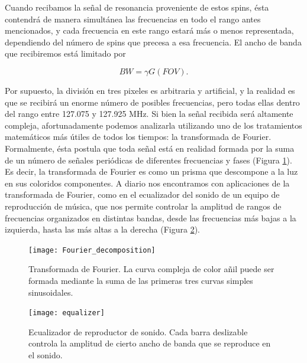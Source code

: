 Cuando recibamos la señal de resonancia proveniente de estos spins, ésta contendrá de manera simultánea las frecuencias en todo el rango antes mencionados, y cada frecuencia en este rango estará más o menos representada, dependiendo del número de spins que precesa a esa frecuencia. El ancho de banda que recibiremos está limitado por

\begin{equation}
 BW = \gamma G (FOV).
 \label{eq_bw_read}
\end{equation}


Por supuesto, la división en tres pixeles es arbitraria y artificial, y la realidad es que se recibirá un enorme número de posibles frecuencias, pero todas ellas dentro del rango entre 127.075 y 127.925 MHz.  Si bien la señal recibida será altamente compleja, afortunadamente podemos analizarla utilizando uno de los tratamientos matemáticos más útiles de todos los tiempos: la transformada de Fourier. Formalmente, ésta postula que toda señal está en realidad formada por la suma de un número de señales periódicas de diferentes frecuencias y fases (Figura \ref{fig:Fourier_decomposition}). Es decir, la transformada de Fourier es como un prisma que descompone a la luz en sus coloridos componentes. A diario nos encontramos con aplicaciones de la transformada de Fourier, como en el ecualizador del sonido de un equipo de reproducción de música, que nos permite controlar la amplitud de rangos de frecuencias organizados en distintas bandas, desde las frecuencias más bajas a la izquierda, hasta las más altas a la derecha (Figura \ref{fig:equalizer}). 

\begin{figure}[htb]
 \begin{figg}
   \texttt{[image: Fourier\_decomposition]}
   \caption{Transformada de Fourier. La curva compleja de color añil puede ser formada mediante la suma de las primeras tres curvas simples sinusoidales.}
 \label{fig:Fourier_decomposition}
 \end{figg}
\end{figure}

\begin{figure}[htb]
 \begin{figg}
   \texttt{[image: equalizer]}
   \caption{Ecualizador de reproductor de sonido. Cada barra deslizable controla la amplitud de cierto ancho de banda que se reproduce en el sonido.} 
 \label{fig:equalizer}
 \end{figg}
\end{figure}


